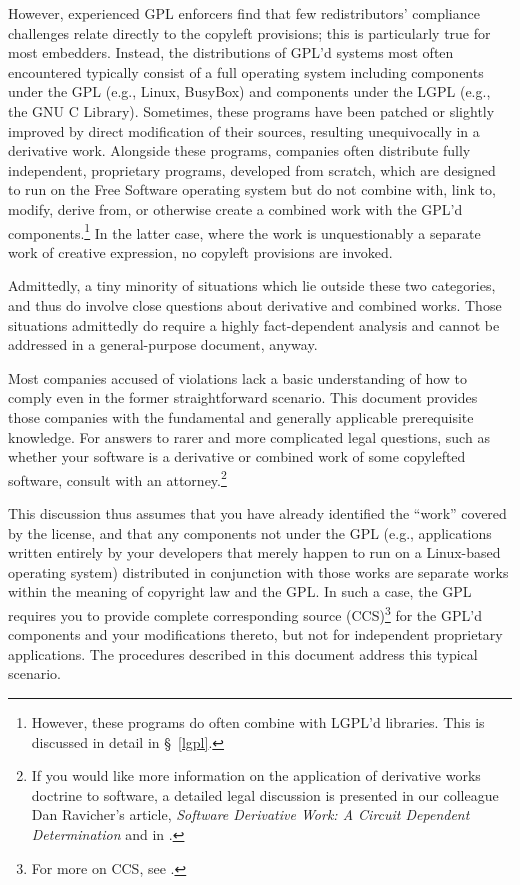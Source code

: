 However, experienced  GPL enforcers find that few redistributors'
compliance challenges relate directly to the copyleft provisions; this is
particularly true for most embedders.  Instead, the distributions of GPL'd
systems most often encountered typically consist of a full operating system
including components under the GPL (e.g., Linux, BusyBox) and components
under the LGPL (e.g., the GNU C Library).  Sometimes, these programs have
been patched or slightly improved by direct modification of their sources,
resulting unequivocally in a derivative work.  Alongside these programs,
companies often distribute fully independent, proprietary programs,
developed from scratch, which are designed to run on the Free Software operating
system but do not combine with, link to, modify, derive from, or otherwise
create a combined work with
the GPL'd components.\footnote{However, these programs do often combine
  with LGPL'd libraries. This is discussed in detail in \S~\ref{lgpl}.}
In the latter case, where the work is unquestionably a separate work of
creative expression, no copyleft provisions are invoked.

Admittedly, a tiny
minority of situations which lie outside these two categories, and thus
do involve close questions about derivative and combined works.  Those
situations admittedly do require a highly
fact-dependent analysis and cannot be addressed in a general-purpose
document, anyway.

\medskip

Most companies accused of violations lack a basic understanding
of how to comply even in the former straightforward scenario.  This document
provides those companies with the fundamental and generally applicable prerequisite knowledge.
For answers to rarer and more complicated legal questions, such as whether
your software is a derivative or combined work of some copylefted software, consult
with an attorney.\footnote{If you would like more information on the
  application of derivative works doctrine to software, a detailed legal
  discussion is presented in our colleague Dan Ravicher's article,
  \textit{Software Derivative Work: A Circuit Dependent Determination} and in
  .}

This discussion thus assumes that you have already identified the
``work'' covered by the license, and that any components not under the GPL
(e.g., applications written entirely by your developers that merely happen
to run on a Linux-based operating system) distributed in conjunction with
those works are separate works within the meaning of copyright law and the GPL\@.  In
such a case, the GPL requires you to provide complete corresponding
source (CCS)\footnote{For more on CCS,  see
.}
for the GPL'd components and your modifications thereto, but not
for independent proprietary applications.  The procedures described in
this document address this typical scenario.

